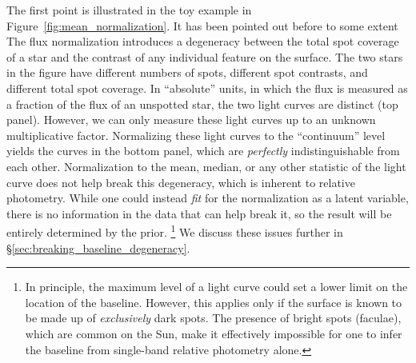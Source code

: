 \documentclass[modern]{aastex62}
\begin{document}
The first point is illustrated in the toy example in
Figure~\ref{fig:mean_normalization}.
It has been pointed out before to some extent \citep[e.g.,][]{Basri2018}
The flux normalization introduces a degeneracy between the total spot coverage
of a star and the contrast of any individual feature on the surface.
The two stars in the figure have different numbers of spots, different
spot contrasts, and different total spot coverage. In ``absolute'' units, in which
the flux is measured as a fraction of the flux of an unspotted star, the two
light curves are distinct (top panel). However, we can only measure these light
curves up to an unknown multiplicative factor. Normalizing these light curves
to the ``continuum'' level yields the curves in the bottom panel, which are
\emph{perfectly} indistinguishable from each other. Normalization to the mean,
median, or any other statistic of the light curve does not help break this
degeneracy, which is inherent to relative photometry. While one could instead \emph{fit}
for the normalization as a latent variable, there is no information in the data
that can help break it, so the result will be entirely determined by the prior.%
\footnote{%
    In principle, the maximum level of a light curve could set a lower limit on
    the location of the baseline. However, this applies only if the surface is
    known to be made up of \emph{exclusively} dark spots. The presence of bright
    spots (faculae), which are common on the Sun, make it effectively impossible
    for one to infer the baseline from single-band relative photometry alone.
}
We discuss these issues further in \S\ref{sec:breaking_baseline_degeneracy}.
\end{document}
